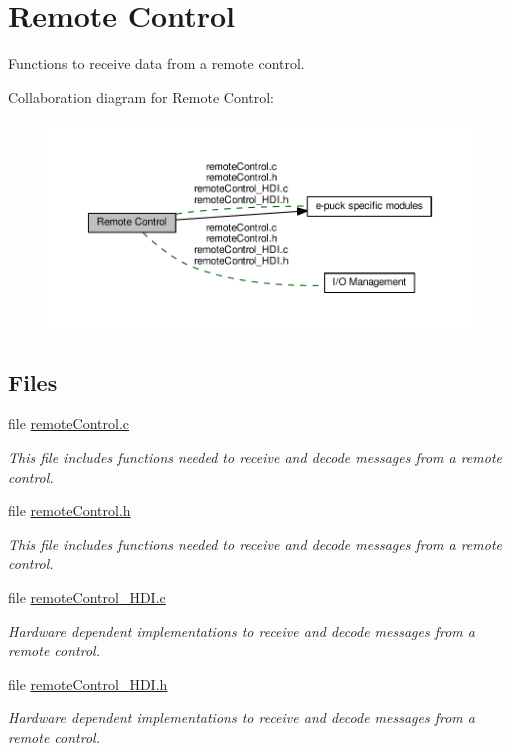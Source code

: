 \hypertarget{group__remotecontrol}{}\section{Remote Control}
\label{group__remotecontrol}


Functions to receive data from a remote control.  


Collaboration diagram for Remote Control\+:\nopagebreak
\begin{figure}[H]
\begin{center}
\leavevmode
\includegraphics[width=350pt]{db/d36/group__remotecontrol}
\end{center}
\end{figure}
\subsection*{Files}
\begin{DoxyCompactItemize}
\item 
file \hyperlink{remoteControl_8c}{remote\+Control.\+c}
\begin{DoxyCompactList}\small\item\em This file includes functions needed to receive and decode messages from a remote control. \end{DoxyCompactList}\item 
file \hyperlink{remoteControl_8h}{remote\+Control.\+h}
\begin{DoxyCompactList}\small\item\em This file includes functions needed to receive and decode messages from a remote control. \end{DoxyCompactList}\item 
file \hyperlink{remoteControl__HDI_8c}{remote\+Control\+\_\+\+H\+D\+I.\+c}
\begin{DoxyCompactList}\small\item\em Hardware dependent implementations to receive and decode messages from a remote control. \end{DoxyCompactList}\item 
file \hyperlink{remoteControl__HDI_8h}{remote\+Control\+\_\+\+H\+D\+I.\+h}
\begin{DoxyCompactList}\small\item\em Hardware dependent implementations to receive and decode messages from a remote control. \end{DoxyCompactList}\end{DoxyCompactItemize}


